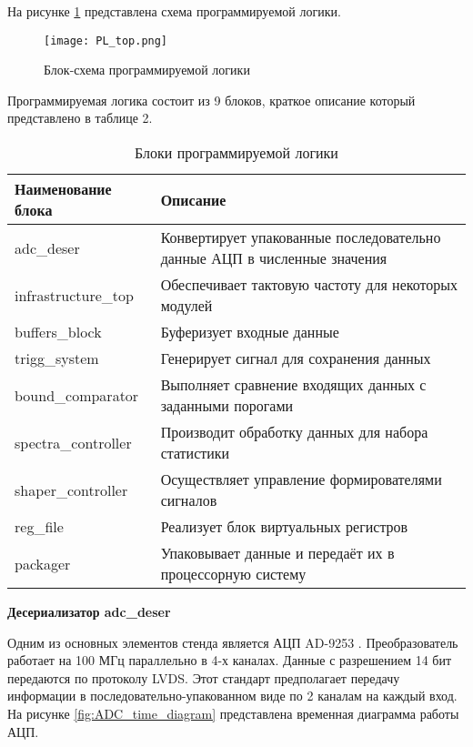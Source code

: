 На рисунке \ref{fig:PL_top} представлена схема программируемой логики.\par 
\begin{figure}[ht]
    \centering
    \texttt{[image: PL\_top.png]}
    \caption{Блок-схема программируемой логики}
    \label{fig:PL_top}
\end{figure}
Программируемая логика состоит из 9 блоков, краткое описание который представлено в таблице 2.\par%
\begin{table}[ht] \label{tab:PL_top_blocks}
    \caption{Блоки программируемой логики}
    \begin{tabular}{|p{}|p{}|}
        \hline
        Наименование блока & Описание \\
        \hline
        adc\_deser & Конвертирует упакованные последовательно данные АЦП в численные значения \\
        \hline
        infrastructure\_top & Обеспечивает тактовую частоту для некоторых модулей \\
        \hline
        buffers\_block & Буферизует входные данные \\
        \hline
        trigg\_system & Генерирует сигнал для сохранения данных \\
        \hline
        bound\_comparator & Выполняет сравнение входящих данных с заданными порогами \\
        \hline
        spectra\_controller & Производит обработку данных для набора статистики \\
        \hline
        shaper\_controller & Осуществляет управление формирователями сигналов \\
        \hline
        reg\_file & Реализует блок виртуальных регистров \\
        \hline
        packager & Упаковывает данные и передаёт их в процессорную систему \\
        \hline
    \end{tabular}
\end{table}
\textbf{Десериализатор adc\_deser}\par
Одним из основных элементов стенда является АЦП AD-9253 \parencite{AD9253}. Преобразователь работает на 100 МГц параллельно в 4-х каналах. Данные с разрешением 14 бит передаются по протоколу LVDS. Этот стандарт предполагает передачу информации в последовательно-упакованном виде по 2 каналам на каждый вход. На рисунке \ref{fig:ADC_time_diagram} представлена временная диаграмма работы АЦП.\par
